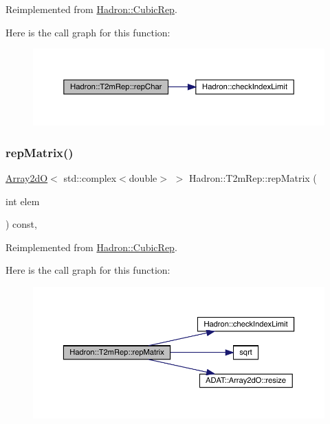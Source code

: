 Reimplemented from \mbox{\hyperlink{structHadron_1_1CubicRep_af45227106e8e715e84b0af69cd3b36f8}{Hadron\+::\+Cubic\+Rep}}.

Here is the call graph for this function\+:
\nopagebreak
\begin{figure}[H]
\begin{center}
\leavevmode
\includegraphics[width=350pt]{d7/dc8/structHadron_1_1T2mRep_af6775da2b681eda429dc3a5c026cc877_cgraph}
\end{center}
\end{figure}
\mbox{\label{structHadron_1_1T2mRep_a19df67dde8ae1b7f7436559ee5218f13}} 
\subsubsection{\texorpdfstring{repMatrix()}{repMatrix()}\hspace{0.1cm}{\footnotesize\ttfamily [1/2]}}
{\footnotesize\ttfamily \mbox{\hyperlink{classADAT_1_1Array2dO}{Array2dO}}$<$ std\+::complex$<$double$>$ $>$ Hadron\+::\+T2m\+Rep\+::rep\+Matrix (\begin{DoxyParamCaption}\item[{int}]{elem }\end{DoxyParamCaption}) const\hspace{0.3cm}{\ttfamily [inline]}, {\ttfamily [virtual]}}



Reimplemented from \mbox{\hyperlink{structHadron_1_1CubicRep_ac5d7e9e6f4ab1158b5fce3e4ad9e8005}{Hadron\+::\+Cubic\+Rep}}.

Here is the call graph for this function\+:
\nopagebreak
\begin{figure}[H]
\begin{center}
\leavevmode
\includegraphics[width=350pt]{d7/dc8/structHadron_1_1T2mRep_a19df67dde8ae1b7f7436559ee5218f13_cgraph}
\end{center}
\end{figure}
\mbox{\label{structHadron_1_1T2mRep_a19df67dde8ae1b7f7436559ee5218f13}} 
